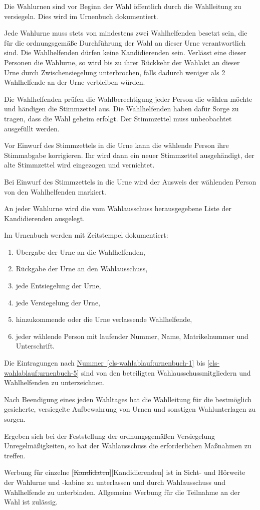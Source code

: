\documentclass[%
draft,%
multilinesections%
]{fswo}
\newcommand\oldT[1]  {{\color{Gray}[\st{#1}]}}
\newcommand\newT[1]  {{\color{Green}[#1]}}
\newcommand\oldT[1]{}%
\newcommand\newT[1]{#1}
\newcommand\change[2]{\oldT{#1}\newT{#2}}
\newcommand*{\refItem}[1]{\hyperref[#1]{Nummer~\ref{#1}}}
\begin{document}
\begin{contract}
\label{cls-wahlablauf}
Die Wahlurnen sind vor Beginn der Wahl öffentlich durch die Wahlleitung zu versiegeln.
Dies wird im Urnenbuch dokumentiert.

Jede Wahlurne muss stets von mindestens zwei Wahlhelfenden besetzt sein, die für die ordnungsgemäße Durchführung der Wahl an dieser Urne verantwortlich sind.
Die Wahlhelfenden dürfen keine Kandidierenden sein.
Verlässt eine dieser Personen die Wahlurne, so wird bis zu ihrer Rückkehr der Wahlakt an dieser Urne durch Zwischensiegelung unterbrochen, falls dadurch weniger als 2 Wahlhelfende an der Urne verbleiben würden.

Die Wahlhelfenden prüfen die Wahlberechtigung jeder Person die wählen möchte und händigen die Stimmzettel aus.
Die Wahlhelfenden haben dafür Sorge zu tragen, dass die Wahl geheim erfolgt.
Der Stimmzettel muss unbeobachtet ausgefüllt werden.

Vor Einwurf des Stimmzettels in die Urne kann die wählende Person ihre Stimmabgabe korrigieren.
Ihr wird dann ein neuer Stimmzettel ausgehändigt, der alte Stimmzettel wird eingezogen und vernichtet.

Bei Einwurf des Stimmzettels in die Urne wird der Ausweis der wählenden Person von den Wahlhelfenden markiert.

An jeder Wahlurne wird die vom Wahlausschuss herausgegebene Liste der Kandidierenden ausgelegt.

Im Urnenbuch werden mit Zeitstempel dokumentiert:
\begin{enumerate}
\item Übergabe der Urne an die Wahlhelfenden,\label{cls-wahlablauf:urnenbuch-1}
\item Rückgabe der Urne an den Wahlausschuss,
\item jede Entsiegelung der Urne,
\item jede Versiegelung der Urne,
\item hinzukommende oder die Urne verlassende Wahlhelfende,\label{cls-wahlablauf:urnenbuch-5}
\item jeder wählende Person mit laufender Nummer, Name, Matrikelnummer und Unterschrift.
\end{enumerate}
Die Eintragungen nach \refItem{cls-wahlablauf:urnenbuch-1} bis \ref{cls-wahlablauf:urnenbuch-5} sind von den beteiligten Wahlausschussmitgliedern und Wahlhelfenden zu unterzeichnen.

Nach Beendigung eines jeden Wahltages hat die Wahlleitung für die bestmöglich gesicherte, versiegelte Aufbewahrung von Urnen und sonstigen Wahlunterlagen zu sorgen.

Ergeben sich bei der Feststellung der ordnungsgemäßen Versiegelung Unregelmäßigkeiten, so hat der Wahlausschuss die erforderlichen Maßnahmen zu treffen.

Werbung für einzelne \change{Kandidaten}{Kandidierenden} ist in Sicht- und Hörweite der Wahlurne und -kabine zu unterlassen und durch Wahlausschuss und Wahlhelfende zu unterbinden.
Allgemeine Werbung für die Teilnahme an der Wahl ist zulässig.
\end{contract}
\end{document}
